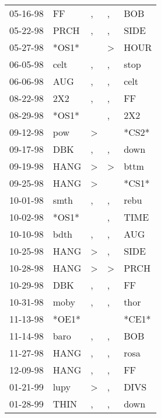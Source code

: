\begin{supertabular}{lllll}
 05-16-98 &     FF &                , &                , &    BOB \\
 05-22-98 &   PRCH &                , &                , &   SIDE \\
 05-27-98 &  *OS1* &                  &     \textgreater &   HOUR \\
 06-05-98 &   celt &                , &                , &   stop \\
 06-06-98 &    AUG &                , &                , &   celt \\
 08-22-98 &    2X2 &                , &                , &     FF \\
 08-29-98 &  *OS1* &                  &                , &    2X2 \\
 09-12-98 &    pow &     \textgreater &                  &  *CS2* \\
 09-17-98 &    DBK &                , &                , &   down \\
 09-19-98 &   HANG &     \textgreater &     \textgreater &   bttm \\
 09-25-98 &   HANG &     \textgreater &                  &  *CS1* \\
 10-01-98 &   smth &                , &                , &   rebu \\
 10-02-98 &  *OS1* &                  &                , &   TIME \\
 10-10-98 &   bdth &                , &                , &    AUG \\
 10-25-98 &   HANG &     \textgreater &                , &   SIDE \\
 10-28-98 &   HANG &     \textgreater &     \textgreater &   PRCH \\
 10-29-98 &    DBK &                , &                , &     FF \\
 10-31-98 &   moby &                , &                , &   thor \\
 11-13-98 &  *OE1* &                  &                  &  *CE1* \\
 11-14-98 &   baro &                , &                , &    BOB \\
 11-27-98 &   HANG &                , &                , &   rosa \\
 12-09-98 &   HANG &                , &                , &     FF \\
 01-21-99 &   lupy &     \textgreater &                , &   DIVS \\
 01-28-99 &   THIN &                , &                , &   down \\

\end{supertabular}
